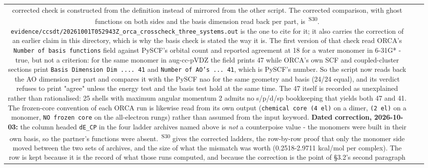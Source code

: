 \documentclass[11pt]{article}
\newcommand{\prov}[1]{\textsuperscript{\,#1}}
\begin{document}
\begin{longtable}{c>{\raggedright\arraybackslash}p{}>{\raggedright\arraybackslash}p{}}
corrected check is constructed from the definition instead of mirrored from the other script. The corrected comparison, with ghost functions on both sides and the basis dimension read back per part, is \prov{S30}. \texttt{evidence/\allowbreak{}ccsdt/\allowbreak{}20261001T052943Z\_\allowbreak{}orca\_\allowbreak{}crosscheck\_\allowbreak{}three\_\allowbreak{}systems.out} is the one to cite for it; it also carries the correction of an earlier claim in this directory, which is why the basis check is stated the way it is. The first version of that check read ORCA's \texttt{Number of basis functions} field against PySCF's orbital count and reported agreement at 18 for a water monomer in 6-31G* - true, but not a criterion: for the same monomer in aug-cc-pVDZ the field prints 47 while ORCA's own SCF and coupled-cluster sections print \texttt{Basis Dimension Dim .... 41} and \texttt{Number of AO's ... 41}, which is PySCF's number. So the script now reads back the AO dimension per part and compares it with the PySCF nao for the same geometry and basis (24/24 equal), and its verdict refuses to print "agree" unless the energy test and the basis test hold at the same time. The 47 itself is recorded as unexplained rather than rationalised: 25 shells with maximum angular momentum 2 admits no s/p/d/sp bookkeeping that yields both 47 and 41. The frozen-core convention of each ORCA run is likewise read from its own output (\texttt{chemical core (4 el)} on a dimer, \texttt{(2 el)} on a monomer, \texttt{NO frozen core} on the all-electron rungs) rather than assumed from the input keyword. \textbf{Dated correction, 2026-10-03:} the column headed \texttt{dE\_CP} in the four ladder archives named above is \emph{not} a counterpoise value - the monomers were built in their own basis, so the partner's functions were absent. \prov{S30} gives the corrected ladders, the row-by-row proof that only the monomer side moved between the two sets of archives, and the size of what the mismatch was worth (0.2518-2.9711 kcal/mol per complex). The row is kept because it is the record of what those runs computed, and because the correction is the point of \S{}3.2's second paragraph \\

\end{longtable}
\end{document}

